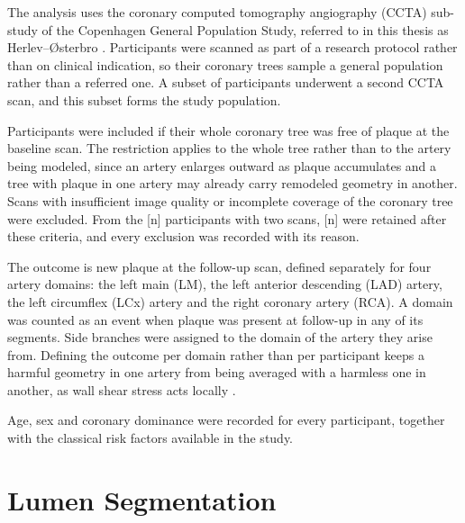 The analysis uses the coronary computed tomography angiography (CCTA) sub-study of the
Copenhagen General Population Study, referred to in this thesis as Herlev--{\O}sterbro
\cite{fuchs2023cgps}.
Participants were scanned as part of a research protocol rather than on clinical indication, so
their coronary trees sample a general population rather than a referred one.
A subset of participants underwent a second CCTA scan, and this subset forms the study population.

Participants were included if their whole coronary tree was free of plaque at the baseline scan.
The restriction applies to the whole tree rather than to the artery being modeled, since an
artery enlarges outward as plaque accumulates \cite{glagov1987remodeling} and a tree with plaque
in one artery may already carry remodeled geometry in another.
Scans with insufficient image quality or incomplete coverage of the coronary tree were excluded.
From the [n] participants with two scans, [n] were retained after these criteria, and every
exclusion was recorded with its reason.

The outcome is new plaque at the follow-up scan, defined separately for four artery domains: the
left main (LM), the left anterior descending (LAD) artery, the left circumflex (LCx) artery and
the right coronary artery (RCA).
A domain was counted as an event when plaque was present at follow-up in any of its segments.
Side branches were assigned to the domain of the artery they arise from.
Defining the outcome per domain rather than per participant keeps a harmful geometry in one artery
from being averaged with a harmless one in another, as wall shear stress acts locally
\cite{chatzizisis2007ess}.

Age, sex and coronary dominance were recorded for every participant, together with the classical
risk factors available in the study.


\section{Lumen Segmentation}
\label{sec:method-segmentation}


